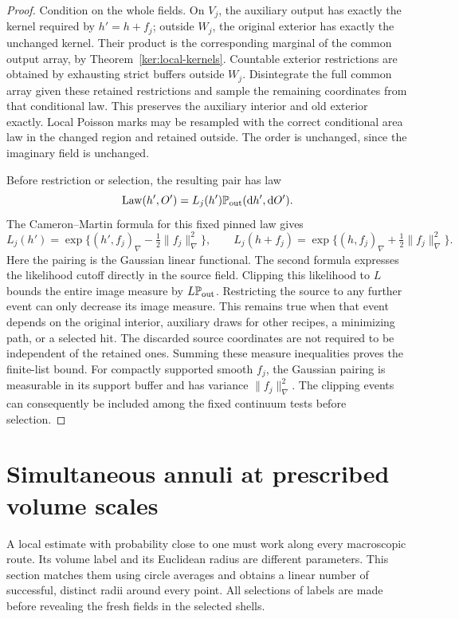 \documentclass[11pt]{article}
\numberwithin{equation}{section}
\theoremstyle{definition}
\theoremstyle{remark}
\newcommand{\1}{\mathbf 1}
\begin{document}
\begin{proof}
Condition on the whole fields.  On \(V_j\), the auxiliary output
has exactly the kernel required by \(h'=h+f_j\); outside \(W_j\),
the original exterior has exactly the unchanged kernel.  Their
product is the corresponding marginal of the common output array,
by Theorem~\ref{ker:local-kernels}.  Countable exterior restrictions
are obtained by exhausting strict buffers outside \(W_j\).
Disintegrate the full common array given these retained restrictions
and sample the remaining coordinates from that conditional law.
This preserves the auxiliary interior and old exterior exactly.
Local Poisson marks may be resampled with the correct conditional
area law in the changed region and retained outside.  The order is
unchanged, since the imaginary field is unchanged.

Before restriction or selection, the resulting pair has law
\[
 \operatorname{Law}(h',O')=L_j(h')\mathbb P_{\rm out}(\mathrm d h',\mathrm d O').
\]
The Cameron--Martin formula for this fixed pinned law gives
\[
 L_j(h')=\exp\{(h',f_j)_\nabla-\tfrac12\|f_j\|_\nabla^2\},
 \qquad
 L_j(h+f_j)=\exp\{(h,f_j)_\nabla+\tfrac12\|f_j\|_\nabla^2\}.
\]
Here the pairing is the Gaussian linear functional. The second formula
expresses the likelihood cutoff directly in the source field. Clipping
this likelihood to \(L\) bounds the entire image measure by
\(L\mathbb P_{\rm out}\).  Restricting the source to any further event
can only decrease its image measure.  This remains true when that
event depends on the original interior, auxiliary draws for other
recipes, a minimizing path, or a selected hit.  The discarded source
coordinates are not required to be independent of the retained ones.
Summing these measure inequalities proves the finite-list bound.
For compactly supported smooth \(f_j\), the Gaussian pairing is
measurable in its support buffer and has variance
\(\|f_j\|_\nabla^2\).  The clipping events can consequently be
included among the fixed continuum tests before selection.
\end{proof}

\section{Simultaneous annuli at prescribed volume scales}
\label{ann:section}

A local estimate with probability close to one must work along every
macroscopic route.  Its volume label and its Euclidean radius are
different parameters.  This section matches them using circle averages
and obtains a linear number of successful, distinct radii around every
point.  All selections of labels are made before revealing the fresh
fields in the selected shells.
\end{document}
